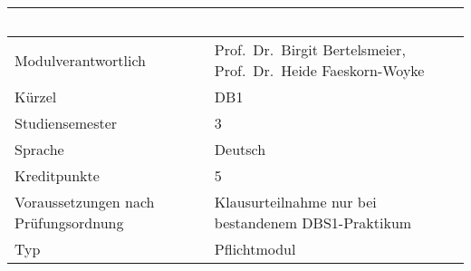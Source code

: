 \begin{longtable}[]{@{}ll@{}}
\toprule
\begin{minipage}[b]{0.12\columnwidth}\raggedright\strut
~\strut
\end{minipage} & \begin{minipage}[b]{0.12\columnwidth}\raggedright\strut
~\strut
\end{minipage}\tabularnewline
\midrule
\endhead
\begin{minipage}[t]{0.12\columnwidth}\raggedright\strut
Modulverantwortlich\strut
\end{minipage} & \begin{minipage}[t]{0.12\columnwidth}\raggedright\strut
Prof.~Dr.~Birgit Bertelsmeier, Prof.~Dr.~Heide Faeskorn-Woyke\strut
\end{minipage}\tabularnewline
\begin{minipage}[t]{0.12\columnwidth}\raggedright\strut
Kürzel\strut
\end{minipage} & \begin{minipage}[t]{0.12\columnwidth}\raggedright\strut
DB1\strut
\end{minipage}\tabularnewline
\begin{minipage}[t]{0.12\columnwidth}\raggedright\strut
Studiensemester\strut
\end{minipage} & \begin{minipage}[t]{0.12\columnwidth}\raggedright\strut
3\strut
\end{minipage}\tabularnewline
\begin{minipage}[t]{0.12\columnwidth}\raggedright\strut
Sprache\strut
\end{minipage} & \begin{minipage}[t]{0.12\columnwidth}\raggedright\strut
Deutsch\strut
\end{minipage}\tabularnewline
\begin{minipage}[t]{0.12\columnwidth}\raggedright\strut
Kreditpunkte\strut
\end{minipage} & \begin{minipage}[t]{0.12\columnwidth}\raggedright\strut
5\strut
\end{minipage}\tabularnewline
\begin{minipage}[t]{0.12\columnwidth}\raggedright\strut
Voraussetzungen nach Prüfungsordnung\strut
\end{minipage} & \begin{minipage}[t]{0.12\columnwidth}\raggedright\strut
Klausurteilnahme nur bei bestandenem DBS1-Praktikum\strut
\end{minipage}\tabularnewline
\begin{minipage}[t]{0.12\columnwidth}\raggedright\strut
Typ\strut
\end{minipage} & \begin{minipage}[t]{0.12\columnwidth}\raggedright\strut
Pflichtmodul\strut
\end{minipage}\tabularnewline
\bottomrule
\end{longtable}

